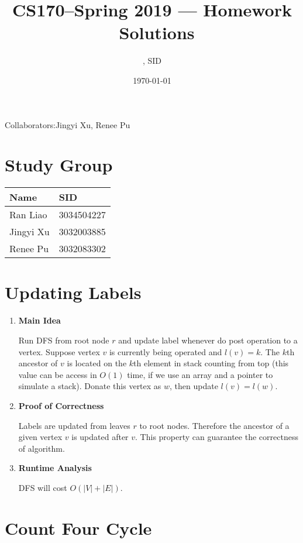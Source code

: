 \documentclass[11pt]{article}
\title{CS170--Spring 2019 --- Homework \Homework\ Solutions}
\author{\Name, SID \SID}
\date{\today}
\newenvironment{qparts}{\begin{enumerate}[{(}a{)}]}{\end{enumerate}}
\begin{document}
\maketitle
Collaborators:Jingyi Xu, Renee Pu

\section{Study Group}
	\begin{tabular}{ll}
		Name		&   SID         		\\\hline
		Ran Liao		&   3034504227  	\\  
		Jingyi Xu		&   3032003885  	\\
		Renee Pu		&   3032083302  	\\
	\end{tabular}



\newpage
\section{Updating Labels}

\begin{qparts}
	\item \textbf{Main Idea}

	Run DFS from root node $r$ and update label whenever do post operation to a vertex. Suppose vertex $v$ is currently being operated and $l(v) = k$. The $k$th ancestor of $v$ is located on the $k$th element in stack counting from top (this value can be access in $O(1)$ time, if we use an array and a pointer to simulate a stack). Donate this vertex as $w$, then update $l(v) = l(w)$.
	
	\item \textbf{Proof of Correctness}
	
	Labels are updated from leaves $r$ to root nodes. Therefore the ancestor of a given vertex $v$ is updated after $v$. This property can guarantee the correctness of algorithm.
	

	\item \textbf{Runtime Analysis}
	
	DFS will cost $O(|V| + |E|)$.
	

\end{qparts}

\newpage
\section{Count Four Cycle}
\end{document}
